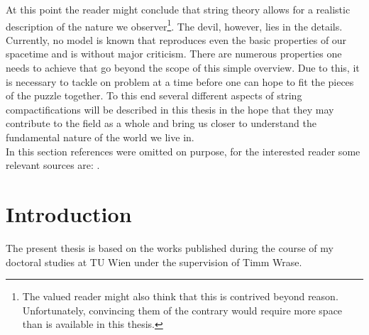\documentclass[12pt]{report}
\begin{document}
At this point the reader might conclude that string theory allows for a realistic description of the nature we observer\footnote{The valued reader might also think that this is contrived beyond reason. Unfortunately, convincing them of the contrary would require more space than is available in this thesis.}. The devil, however, lies in the details. Currently, no model is known that reproduces even the basic properties of our spacetime and is without major criticism. There are numerous properties one needs to achieve that go beyond the scope of this simple overview. Due to this, it is necessary to tackle on problem at a time before one can hope to fit the pieces of the puzzle together. To this end several different aspects of string compactifications will be described in this thesis in the hope that they may contribute to the field as a whole and bring us closer to understand the fundamental nature of the world we live in.\\

In this section references were omitted on purpose, for the interested reader some relevant sources are: \cite{above}.

\chapter{Introduction}


The present thesis is based on the works \cite{Roupec:2018mbn,Banlaki:2018ayh,Andriot:2018mav,Cribiori:2019hod,Cribiori:2019bfx,Cribiori:2019drf,Cribiori:2019hrb,Cribiori:2020bgt} published during the course of my doctoral studies at TU Wien under the supervision of Timm Wrase.
\end{document}
